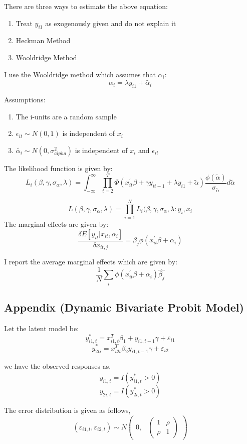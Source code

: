 \documentclass[11pt]{article}
\begin{document}
There are three ways to estimate the above equation: 
\begin{enumerate}
\item Treat $y_{i1}$ as exogenously given and do not explain it
\item Heckman Method
\item Wooldridge Method
\end{enumerate} 
I use the Wooldridge method which assumes that $\alpha_{i}$:
$$\alpha_{i} = \lambda y_{i1} + \tilde{\alpha_{i}}$$

Assumptions: 

\begin{enumerate}
\item The i-units are a random sample
\item $\epsilon_{it} \sim N(0,1)$ is independent of $x_{i}$
\item $\tilde{\alpha_{i}} \sim N(0,\sigma_{alpha}^{2})$ is independent of
  $x_{i}$ and $\epsilon_{it}$
\end{enumerate}

The likelihood function is given by:
$$ L_{i}(\beta, \gamma, \sigma_{\alpha},\lambda)= \int_{-\infty}^{\infty}
\prod_{t=2}^{T}\Phi(x^{'}_{it}\beta + \gamma y_{it-1} + \lambda y_{i1} +
\tilde{\alpha}) \frac{\phi(\tilde{\alpha})}{\sigma_{\tilde{\alpha}}}
d\tilde{\alpha}$$ 

$$ L(\beta, \gamma, \sigma_{\alpha},\lambda) = \prod_{i=1}^{N}L_{i}(\beta, \gamma, \sigma_{\alpha},\lambda:y_{i},x_{i}$$
The marginal effects are given by:
\begin{equation}
\frac{\delta E[y_{it}|x_{it}, \alpha_{i}]}{\delta x_{it,j}} =
\beta_{j}\phi(x_{it}^{'} \beta + \alpha_{i})
\end{equation}

I report the average marginal effects which are given by: 
$$ \frac{1}{N} \sum_{i}\phi( x_{it}^{'} \beta + \alpha_{i})
\hat{\beta_{j}}$$

\subsection{Appendix (Dynamic Bivariate Probit Model)}
Let the latent model be: 
$$y^{*}_{i1,t}= x_{i1,t}^{T}\beta_{1} + y_{i1,t-1}\gamma + \varepsilon_{i1}$$
$$y^{*}_{2ti}= x_{i2t}^{T}\beta_{2}y_{i1,t-1}\gamma + \varepsilon_{i2}$$

we have the observed responses as, 
$$y_{i1,t}= I(y^{*}_{i1,t}>0)$$
$$y_{2i,t}= I(y^{*}_{2i,t}>0)$$

The error distribution is given as follows,
$$(\varepsilon_{i1,t}, \varepsilon_{i2,t}) \sim N \begin{pmatrix} 0, & \begin{pmatrix}1 & \rho\\ \rho & 1\end{pmatrix} 
\end{pmatrix}$$
\end{document}
